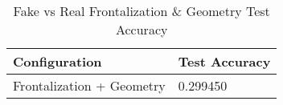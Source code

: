 \begin{table}[H] \centering

\makeatletter
\def\rulecolor#1#{\CT@arc{#1}}
\def\CT@arc#1#2{%
\ifdim\baselineskip=\z@\noalign\fi
{\gdef\CT@arc@{\color#1{#2}}}}
\let\CT@arc@\relax
{}
\makeatother

\begin{tabular}{@{}l|l@{}}
	\toprule
    Configuration & Test Accuracy \\
    
    \midrule
    Frontalization + Geometry & 0.299450 \\    
    
    \bottomrule
\end{tabular}
    
	\caption{Fake vs Real Frontalization \& Geometry Test Accuracy} 
    \label{table:fake-fakereal_frontal_geo}

\end{table}